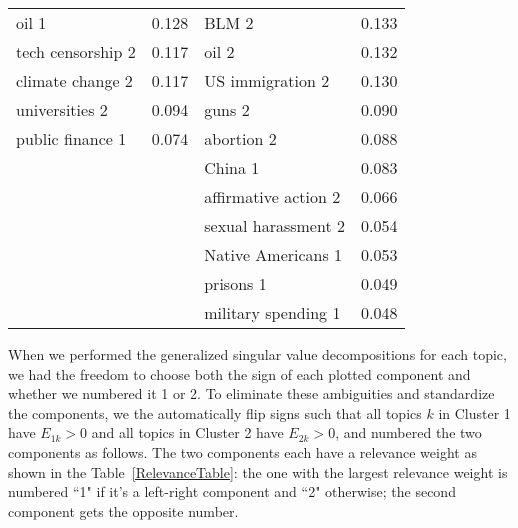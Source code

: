 \documentclass[10pt,letterpaper]{article}
\def\tabl#1{Table~\ref{#1}}
\begin{document}
\begin{table}[h]
\begin{tabular}{|l|c|l|c|}
oil 1                & 0.128 & BLM 2       & 0.133               \\ 
tech censorship 2         & 0.117 & oil 2                & 0.132               \\ 
climate change 2     & 0.117 & US immigration 2     & 0.130               \\ 
universities 2       & 0.094 & guns 2               & 0.090               \\ 
public finance 1     & 0.074 & abortion 2           & 0.088               \\ 
&& China 1              & 0.083               \\ 
&& affirmative action 2 & 0.066               \\ 
&& sexual harassment 2  & 0.054               \\ 
&& Native Americans 1   & 0.053               \\ 
&& prisons 1            & 0.049               \\ 
&& military spending 1  & 0.048               \\ \hline
\end{tabular}
\end{table}

When we performed the generalized singular value decompositions for each topic, we had the freedom to choose both the sign of each plotted component and whether we numbered it 1 or 2.
To eliminate these ambiguities and standardize the components, we the automatically flip signs such that all topics $k$ in Cluster 1 have
$E_{1k}>0$ and all topics in Cluster 2 have $E_{2k}>0$, and numbered the two components as follows.
The two components each have a relevance weight as shown in the \tabl{RelevanceTable}: 
the one with the largest relevance weight is numbered ``1" if it's a left-right component and ``2" otherwise; the second component gets the opposite number.
\end{document}
